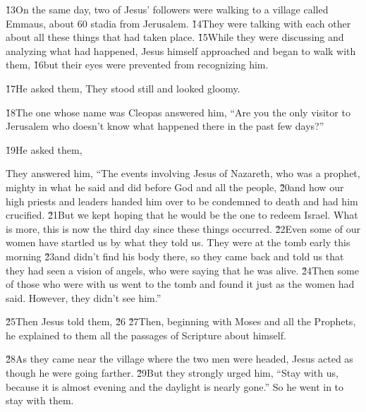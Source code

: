 \v{13}On the same day, two of Jesus' followers were walking to a village called Emmaus, about 60 stadia from Jerusalem. \v{14}They were talking with each other about all these things that had taken place. \v{15}While they were discussing and analyzing what had happened, Jesus himself approached and began to walk with them, \v{16}but their eyes were prevented from recognizing him.

\v{17}He asked them,  They stood still and looked gloomy.

\v{18}The one whose name was Cleopas answered him, ``Are you the only visitor to Jerusalem who doesn't know what happened there in the past few days?''

\v{19}He asked them, 

They answered him, ``The events involving Jesus of Nazareth, who was a prophet, mighty in what he said and did before God and all the people, \v{20}and how our high priests and leaders handed him over to be condemned to death and had him crucified. \v{21}But we kept hoping that he would be the one to redeem Israel. What is more, this is now the third day since these things occurred. \v{22}Even some of our women have startled us by what they told us. They were at the tomb early this morning \v{23}and didn't find his body there, so they came back and told us that they had seen a vision of angels, who were saying that he was alive. \v{24}Then some of those who were with us went to the tomb and found it just as the women had said. However, they didn't see him.''

\v{25}Then Jesus told them,  \v{26} \v{27}Then, beginning with Moses and all the Prophets, he explained to them all the passages of Scripture about himself.

\v{28}As they came near the village where the two men were headed, Jesus acted as though he were going farther. \v{29}But they strongly urged him, ``Stay with us, because it is almost evening and the daylight is nearly gone.'' So he went in to stay with them.

